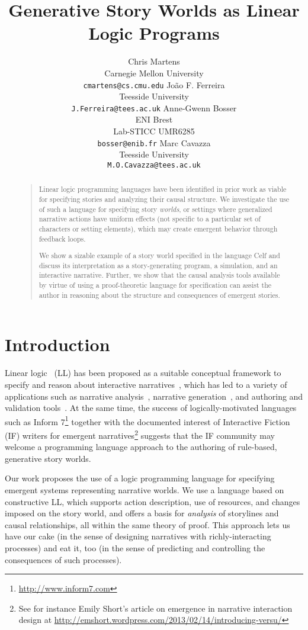 \documentclass[letterpaper]{article}
\title{Generative Story Worlds as Linear Logic Programs}
\author{
Chris Martens \\ Carnegie Mellon University \\ \texttt{cmartens@cs.cmu.edu} \And
Jo\~{a}o F. Ferreira \\ Teesside University \\
\texttt{J.Ferreira@tees.ac.uk} \And
Anne-Gwenn Bosser \\ ENI Brest\\ Lab-STICC UMR6285 \\
\texttt{bosser@enib.fr} \And
Marc Cavazza \\ Teesside University \\ \texttt{M.O.Cavazza@tees.ac.uk}
}
\begin{document}
\maketitle

\begin{abstract}
\begin{quote}
Linear logic programming languages have been identified in prior
work as viable for specifying stories and analyzing their causal structure.
We investigate the use of such a language for specifying story {\em
worlds}, or settings where generalized narrative actions have uniform
effects (not specific to a particular set of characters or setting
elements), which may create emergent behavior through feedback loops.

We show a sizable example of a story world specified in the language Celf
and discuss its interpretation as a story-generating program, a simulation,
and an interactive narrative. Further, we show that the causal analysis
tools available by virtue of using a proof-theoretic language for
specification can assist the author in reasoning about the structure and
consequences of emergent stories.
\end{quote}
\end{abstract}

\section{Introduction}

% 

Linear logic~\cite{girard87linear} (LL) has been proposed as a suitable conceptual
framework to specify and reason about interactive
narratives~\cite{Bosser10}, which has led to a variety of applications such
as narrative analysis~\cite{Bosser11}, narrative
generation~\cite{Martens13:LPNMR}, and authoring and validation
tools~\cite{DangHCS11}. At the same time, the success of
logically-motivated languages such as Inform
7\footnote{\url{http://www.inform7.com}} together with the documented
interest of Interactive Fiction (IF) writers  for emergent
narratives\footnote{See for instance Emily Short's article on emergence in
narrative interaction design at
\url{http://emshort.wordpress.com/2013/02/14/introducing-versu/}} suggests
that the IF community may welcome a programming language approach to the
authoring of rule-based, generative story worlds. 

Our work proposes the use of a logic programming language for specifying
emergent systems representing narrative worlds. We use a language based on
constructive LL, which supports action description, use of resources, and
changes imposed on the story world, and offers a basis for {\em analysis}
of storylines and causal relationships, all within the same theory of
proof.  This approach lets us have our cake (in the sense of designing
narratives with richly-interacting processes) and eat it, too (in the sense
of predicting and controlling the consequences of such processes).
\end{document}
